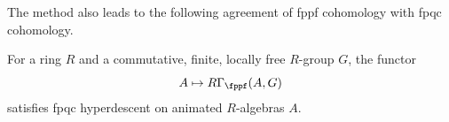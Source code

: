 




The method also leads to the following agreement of fppf cohomology with fpqc cohomology.


\begin{theorem}
\notready\label{thm:strongdescent}
For a ring $R$ and a commutative, finite, locally free $R$-group $G$, the functor
\[
A\mapsto R\Gamma_\fppf(A,G)
\]
satisfies fpqc hyperdescent on animated $R$-algebras $A$. %
\end{theorem}

